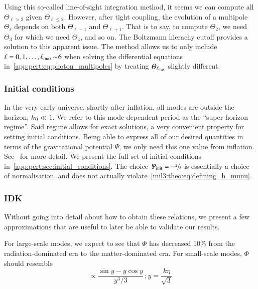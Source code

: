     Using this so-called line-of-sight integration method, it seems we can compute all $\Theta_{\ell>2}$ given $\Theta_{\ell\leq 2}$. However, after tight coupling, the evolution of a multipole $\Theta_\ell$ depends on both $\Theta_{\ell-1}$ and $\Theta_{\ell+1}$. That is to say, to compute $\Theta_2$, we need $\Theta_3$ for which we need $\Theta_4$, and so on. The Boltzmann hierachy cutoff provides a solution to this apparent issue. The method allows us to only include $\ell=0, 1, \dots, \ell_\mathrm{max}\!\sim\! 6$ when solving the differential equations in~\cref{app:pert:eq:photon_multipoles} by treating $\varTheta_{\ell_\mathrm{max}}$ slightly different. 
    


\subsubsection{Initial conditions}
    In the very early universe, shortly after inflation, all modes are outside the horizon; $k\eta\ll 1$. We refer to this mode-dependent period as the ``super-horizon regime''. Said regime allows for exact solutions, a very convenient property for setting initial conditions. Being able to express all of our desired quantities in terms of the gravitational potential $\Psi$, we only need this one value from inflation. See~\citet[Ch.~7,~8]{DodelsonBook} for more detail. We present the full set of initial conditions in~\cref{app:pert:sec:initial_conditions}. The choice $\varPsi_\mathrm{init}=-\sfrac{2}{3}$ is essentially a choice of normalisation, and does not actually violate~\cref{mil3:theo:eq:defining_h_munu}. %


\subsubsection{IDK}
    Without going into detail about how to obtain these relations, we present a few approximations that are useful to later be able to validate our results.

    For large-scale modes, we expect to see that $\Phi$ has decreased 10\% from the radiation-dominated era to the matter-dominated era. For small-scale modes, $\Phi$ should resemble
    \begin{equation}
        \propto \frac{\sin{y}-y\cos{y}}{y^3/3}\,; y=\frac{k\eta}{\sqrt{3}}
    \end{equation}